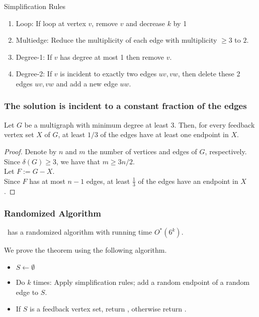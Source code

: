 \begin{frame}{Simplification Rules}

        \begin{enumerate}
            \item Loop: If loop at vertex $v$, remove $v$ and decrease $k$ by 1
            \item Multiedge: Reduce the multiplicity of each edge with multiplicity $\ge 3$ to $2$.
            \item Degree-1: If $v$ has degree at most 1 then remove $v$.
            \item Degree-2: If $v$ is incident to exactly two edges $uv, vw$, then delete these 2 edges $uv, vw$ and add a new edge $uw$.
        \end{enumerate}

\end{frame}


\begin{frame}
	\frametitle{The solution is incident to a constant fraction of the edges}

    \begin{lemma}
        \label{lem:1}
        Let $G$ be a multigraph with minimum degree at least 3. Then, for every feedback vertex set $X$ of $G$, at least $1/3$ of the edges have at least one endpoint in $X$.
    \end{lemma}


    \pause
    \begin{proof}
       	Denote by $n$ and $m$ the number of vertices and edges of $G$, respectively.\\
        Since $\delta(G)\ge 3$, we have that $m\ge 3n/2$.\\ Let $F:= G - X$.\\
        Since $F$ has at most $n - 1$ edges, at least $\frac{1}{3}$ of the edges have an endpoint in $X$.
    \end{proof}

\end{frame}


\begin{frame}[c]\frametitle{Randomized Algorithm}

\begin{theorem}
	\FVS\ has a randomized algorithm with running time $O^*(6^k)$.
\end{theorem}
\pause
\noindent
We prove the theorem using the following algorithm.
\begin{itemize}
	\item $S \leftarrow \emptyset$
	\item Do $k$ times: Apply simplification rules; add a random endpoint of a random edge to $S$.
	\item If $S$ is a feedback vertex set, return \Yes, otherwise return \No.
\end{itemize}
\end{frame}


